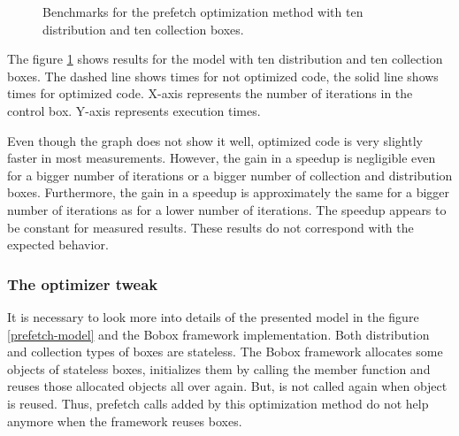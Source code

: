\begin{figure}[h!]
\vspace{.5cm}
\centering
{}
\caption{Benchmarks for the prefetch optimization method with ten distribution and ten collection boxes.}
\label{prefetch-bench}
\end{figure}

The figure \ref{prefetch-bench} shows results for the model with ten distribution and ten collection boxes. The dashed line shows times for not optimized code, the solid line shows times for  optimized code. X-axis represents the number of iterations in the control box. Y-axis represents execution times.

Even though the graph does not show it well, optimized code is very slightly faster in  most measurements. However, the gain in a speedup is negligible even for a bigger number of iterations or a bigger number of collection and distribution boxes. Furthermore, the gain in a speedup is approximately the same for a bigger number of iterations as for a lower number of iterations. The speedup appears to be constant for measured results. These results do not correspond with the expected behavior.

\subsubsection{The optimizer tweak}
It is necessary to look more into details of the presented model in the figure \ref{prefetch-model} and the Bobox framework implementation. Both distribution and collection types of boxes are stateless. The Bobox framework allocates some objects of stateless boxes, initializes them by calling the  member function and reuses those allocated objects all over again. But,  is not called again when object is reused. Thus, prefetch calls added by this optimization method do not help anymore when the framework reuses boxes.

